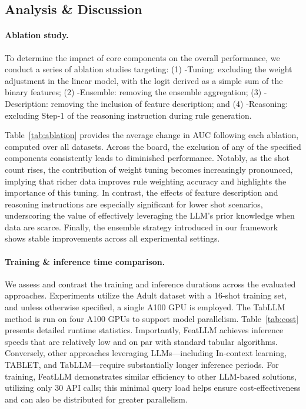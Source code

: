 \subsection{Analysis \& Discussion}
\label{sec:analysis}
\paragraph{Ablation study.} To determine the impact of core components on the overall performance, we conduct a series of ablation studies targeting: (1) \textsf{-Tuning}: excluding the weight adjustment in the linear model, with the logit derived as a simple sum of the binary features; (2) \textsf{-Ensemble}: removing the ensemble aggregation; (3) \textsf{-Description}: removing the inclusion of feature description; and (4) \textsf{-Reasoning}: excluding Step-1 of the reasoning instruction during rule generation.

Table~\ref{tab:ablation} provides the average change in AUC following each ablation, computed over all datasets. Across the board, the exclusion of any of the specified components consistently leads to diminished performance. Notably, as the shot count rises, the contribution of weight tuning becomes increasingly pronounced, implying that richer data improves rule weighting accuracy and highlights the importance of this tuning. In contrast, the effects of feature description and reasoning instructions are especially significant for lower shot scenarios, underscoring the value of effectively leveraging the LLM’s prior knowledge when data are scarce. Finally, the ensemble strategy introduced in our framework shows stable improvements across all experimental settings.

\vspace*{-0.12in}
\paragraph{Training \& inference time comparison.} We assess and contrast the training and inference durations across the evaluated approaches. Experiments utilize the Adult dataset with a 16-shot training set, and unless otherwise specified, a single A100 GPU is employed. The TabLLM method is run on four A100 GPUs to support model parallelism. Table~\ref{tab:cost} presents detailed runtime statistics. Importantly, \textsf{FeatLLM} achieves inference speeds that are relatively low and on par with standard tabular algorithms. Conversely, other approaches leveraging LLMs—including In-context learning, TABLET, and TabLLM—require substantially longer inference periods. For training, \textsf{FeatLLM} demonstrates similar efficiency to other LLM-based solutions, utilizing only 30 API calls; this minimal query load helps ensure cost-effectiveness and can also be distributed for greater parallelism.

